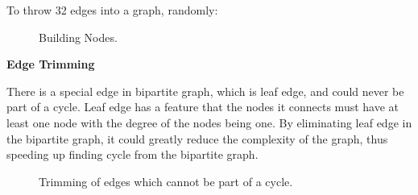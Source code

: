 \documentclass[a4paper,11pt]{article}
\begin{document}
To throw 32 edges into a graph, randomly:

\begin{figure}[ht]
	\centerline{%
	}
	\caption{Building Nodes.}
\end{figure}


\textbf{Edge Trimming}

There is a special edge in bipartite graph, which is leaf edge, and could never be part of a cycle. Leaf edge has a feature that the nodes it connects must have at least one node with the degree of the nodes being one. By eliminating leaf edge in the bipartite graph, it could greatly reduce the complexity of the graph, thus speeding up finding cycle from the bipartite graph.

\begin{figure}[ht]
	\centerline{%
	}
	\caption{Trimming of edges which cannot be part of a cycle.}
\end{figure}
\end{document}
